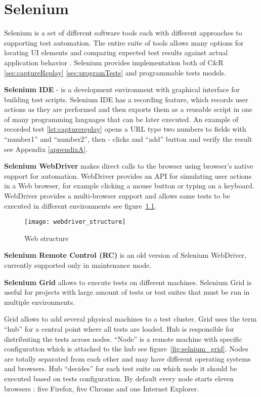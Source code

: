 	\chapter {Selenium}
	\label{ch:selenium}
      Selenium is a set of different software tools each with different
      approaches to supporting test automation. The entire suite of tools allows
      many options for locating UI elements and comparing expected test results
       against actual application behavior \cite{seleniumSite}.
       Selenium provides implementation both of C\&R \ref{sec:captureReplay}
       \ref{sec:programTests} and programmable tests models.  
       
       \textbf{Selenium IDE} - is a development environment with graphical
       interface for building test scripts.
		Selenium IDE has a recording feature,  which records user actions as they are
		performed and then exports them as a reusable script in one of many programming languages that can be later executed.
		An example of recorded test \ref{lst:capturereplay} opens a URL type two
		numbers to fields with ``number1'' and ``number2'', then -
		clicks and ``add'' button and verify the result see Appendix \ref{appendixA}.
		
       \textbf{Selenium  WebDriver} makes direct calls to the browser using
       browser's native support for automation. WebDriver provides an
       API for simulating user actions in a Web browser, for example
       clicking a mouse button or typing on a keyboard.
       WebDriver provides a multi-browser support and allows same tests to be executed in different
       environments see figure~\ref{fig:webdriver}.
       
	  \begin{figure}
	  \centering
  		\texttt{[image: webdriver\_structure]}
  		\caption{Web structure}
  		\label{fig:webdriver}
		\end{figure}
		
    	\textbf{Selenium Remote Control (RC)} is an old version of Selenium
    	WebDriver, currently supported only in maintenance mode.
       
       \textbf{Selenium Grid} allows to execute tests on different machines.
       Selenium Grid is useful for projects with large amount of tests or test
       suites that must be run in multiple environments.
       
		Grid allows to add several physical machines to a test cluster. Grid uses the
		term ``hub'' for a central point where all tests are loaded. Hub is responsible
		for distributing the tests across nodes. ``Node'' is  a remote machine with
		specific configuration which is attached to the hub see
		figure~\ref{fig:selnium_grid}. Nodes are totally separated from each other and
		may have different operating systems and browsers. Hub ``decides''
		for each test suite on which node it should be executed based on tests configuration.
		By default every node starts eleven browsers : five Firefox, five Chrome and
		one Internet Explorer.
		
